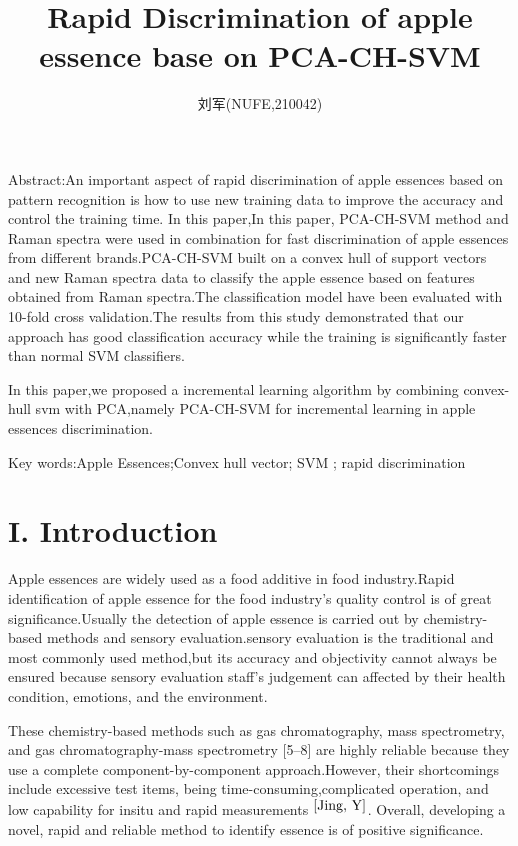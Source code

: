 \documentclass[a4paper]{article}
\author{刘军(NUFE,210042)}
\date{}
\title{Rapid Discrimination of apple essence base on PCA-CH-SVM  }
\begin{document}
\maketitle

Abstract:An important aspect of rapid discrimination of apple essences based on pattern recognition is how to use new training data to improve the accuracy and control the training time. In this paper,In this paper, PCA-CH-SVM method and Raman spectra were used in combination for fast discrimination of apple essences from different brands.PCA-CH-SVM built on a convex hull of support vectors and new Raman spectra data to classify the apple essence based on features obtained from Raman spectra.The classification model have been evaluated with 10-fold cross validation.The results from this study demonstrated that our approach has good classiﬁcation accuracy while the training is signiﬁcantly faster than normal SVM classiﬁers.

In this paper,we proposed a incremental learning algorithm by combining convex-hull svm with PCA,namely PCA-CH-SVM for incremental learning in apple essences discrimination.

Key words:Apple Essences;Convex hull vector; SVM ; rapid discrimination
\section{I. Introduction}
Apple essences are widely used as a food additive in food industry.Rapid identification of apple essence for the food industry's quality control is of great significance.Usually the detection of apple essence is carried out by chemistry-based methods and sensory evaluation.sensory evaluation is the traditional and most commonly used method,but its accuracy and objectivity cannot always be ensured because sensory evaluation staff’s judgement can affected by their health condition, emotions, and the environment.

These chemistry-based methods such as gas chromatography, mass spectrometry, and gas chromatography-mass spectrometry [5–8] are highly reliable because they use a complete component-by-component approach.However, their shortcomings include excessive test items, being time-consuming,complicated operation, and low capability for insitu and rapid measurements $^{\cite{Jing, Y}}$. Overall, developing a novel, rapid and reliable method to identify  essence is of positive significance.
\end{document}
